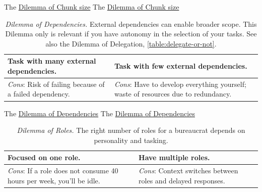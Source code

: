 The \href{table:chunk_size}{Dilemma of Chunk size}
The \href{table:chunk_size}{Dilemma of Chunk size}


\begin{center}
\begin{table}[H] %
\begin{tabular}{ | m{\dilemmatablewidth}| m{\dilemmatablewidth} | } 
  \hline
  \textbf{Task with many external dependencies.} & 
  \textbf{Task with few external dependencies.} \\ 
  \hline
  \textit{Cons}: Risk of failing because of a failed dependency. & 
  \textit{Cons}: Have to develop everything yourself; waste of resources due to redundancy. \\  
  \hline
\end{tabular}
\caption{
\textit{Dilemma of Dependencies.}
External dependencies can enable broader scope. This Dilemma only is relevant if you have autonomy in the selection of your tasks. See also the Dilemma of Delegation, \ref{table:delegate-or-not}.
}
\label{table:number_of_external dependencies}
\end{table}
\end{center}


The \href{table:number_of_external dependencies}{Dilemma of Dependencies}
The \href{table:number_of_external dependencies}{Dilemma of Dependencies}


\begin{center}
\begin{table}[H] %
\begin{tabular}{ | m{\dilemmatablewidth}| m{\dilemmatablewidth} | } 
  \hline
  \textbf{Focused on one role.} & 
  \textbf{Have multiple roles.} \\ 
  \hline
  \textit{Cons}: If a role does not consume 40 hours per week, you'll be idle. & 
  \textit{Cons}: Context switches between roles and delayed responses. \\  
  \hline
\end{tabular}
\caption{
\textit{Dilemma of Roles.}
The right number of roles for a bureaucrat depends on personality and tasking. 
}
\label{table:number_of_roles}
\end{table}
\end{center}



